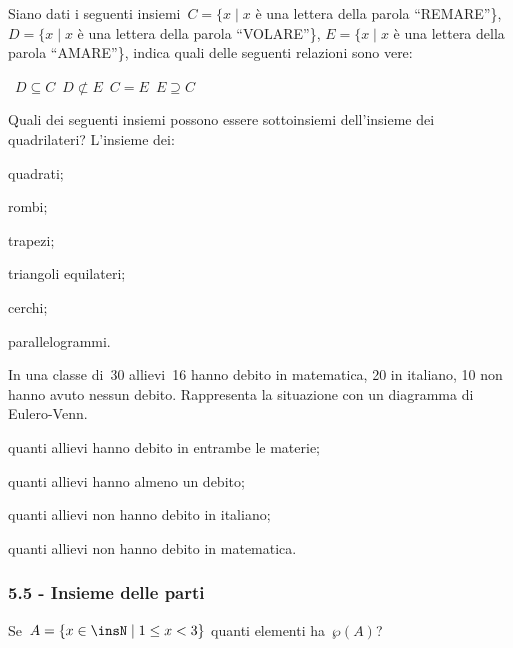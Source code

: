 \begin{esercizio}[\Ast]
\label{ese:5.44}
Siano dati i seguenti insiemi~$C=\{x\mid x$ è una lettera della parola ``REMARE''\}, $D=\{x\mid x$ è una lettera della parola ``VOLARE''\},
$E=\{x\mid x$ è una lettera della parola ``AMARE''\},
indica quali delle seguenti relazioni sono vere:
\begin{center}
\boxA\quad~$D\subseteq C$\quad\boxB\quad~$D\not\subset E$\quad\boxC\quad~$C=E$\quad\boxD\quad~$E\supseteq C$
\end{center}
\end{esercizio}
\pagebreak

\begin{esercizio}[\Ast]
\label{ese:5.45}
Quali dei seguenti insiemi possono essere sottoinsiemi dell'insieme dei quadrilateri?
L'insieme dei:
\begin{multicols}{3}
\begin{enumeratea}
 \item quadrati;
 \item rombi;
 \item trapezi;
 \item triangoli equilateri;
 \item cerchi;
 \item parallelogrammi.
\end{enumeratea}
\end{multicols}
\end{esercizio}

\begin{esercizio}[\Ast]
\label{ese:5.46}
In una classe di~30 allievi~16 hanno debito in matematica, 20 in
italiano, 10 non hanno avuto nessun debito. Rappresenta la situazione
con un diagramma di Eulero-Venn.

\begin{enumeratea}
\item quanti allievi hanno debito in entrambe le materie;
\item quanti allievi hanno almeno un debito;
\item quanti allievi non hanno debito in italiano;
\item quanti allievi non hanno debito in matematica.
\end{enumeratea}
\end{esercizio}

\subsubsection*{5.5 - Insieme delle parti}
\begin{esercizio}[\Ast]
\label{ese:5.47}
Se~$A=\{x\in\insN\mid 1\le x<3\}$ quanti elementi ha~$\wp (A)$?
\end{esercizio}

